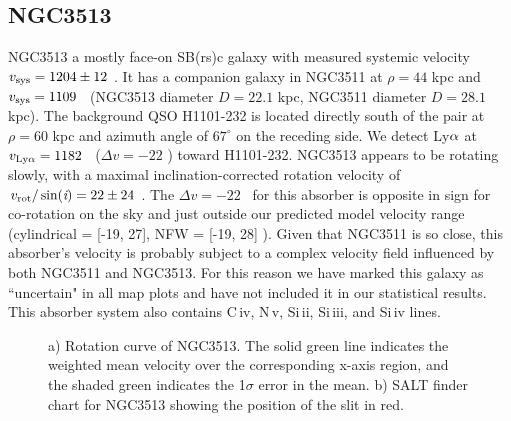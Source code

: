 \subsection{NGC3513}
NGC3513 a mostly face-on SB(rs)c galaxy with measured systemic velocity $v_{\rm sys} = 1204 \pm 12$ \kms. It has a companion galaxy in NGC3511 at $\rho = 44$ kpc and $v_{\rm sys} = 1109$ \kms~(NGC3513 diameter $D = 22.1$ kpc, NGC3511 diameter $D = 28.1$ kpc). The background QSO H1101-232 is located directly south of the pair at $\rho = 60$ kpc and azimuth angle of $67^{\circ}$ on the receding side. We detect Ly$\rm \alpha$ at $v_{\rm Ly\alpha} = 1182$ \kms~($\Delta v = -22$ \kms) toward H1101-232. NGC3513 appears to be rotating slowly, with a maximal inclination-corrected rotation velocity of $v_{\rm rot} / \sin(\emph{i}) = 22 \pm 24$ \kms. The $\Delta v = -22$ \kms~for this absorber is opposite in sign for co-rotation on the sky and just outside our predicted model velocity range (cylindrical = [-19, 27], NFW = [-19, 28] \kms). Given that NGC3511 is so close, this absorber's velocity is probably subject to a complex velocity field influenced by both NGC3511 and NGC3513. For this reason we have marked this galaxy as ``uncertain" in all map plots and have not included it in our statistical results. This absorber system also contains C\,{\sc iv}, N\,{\sc v}, Si\,{\sc ii}, Si\,{\sc iii}, and Si\,{\sc iv} lines.

\begin{figure}[hb]
\centering
  \caption{\small{a) Rotation curve of NGC3513. The solid green line indicates the weighted mean velocity over the corresponding x-axis region, and the shaded green indicates the 1$\sigma$ error in the mean. b) SALT finder chart for NGC3513 showing the position of the slit in red.}}
\vspace{0pt}
\end{figure}



